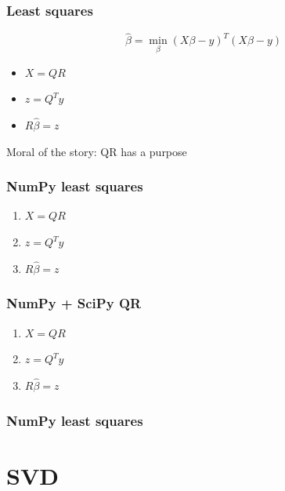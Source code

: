 \documentclass{beamer}
\begin{document}
\begin{frame}
\frametitle{Least squares}

\[
\hat{\beta} = \min_{\beta} (X\beta - y)^T(X\beta - y)
\]

\begin{itemize}
\item $X = QR$
\item $z = Q^Ty$
\item $R\hat{\beta} = z$
\end{itemize}

\vspace{1cm}

Moral of the story: QR has a purpose

\end{frame}

\begin{frame}
\frametitle{NumPy least squares}

\begin{enumerate}
\item $X = QR$
\item $z = Q^Ty$
\item $R\hat{\beta} = z$
\end{enumerate}


\end{frame}


\begin{frame}
\frametitle{NumPy + SciPy QR}

\begin{enumerate}
\item $X = QR$
\item $z = Q^Ty$
\item $R\hat{\beta} = z$
\end{enumerate}


\end{frame}


\begin{frame}
\frametitle{NumPy least squares}


\end{frame}

\section{SVD}
\end{document}
